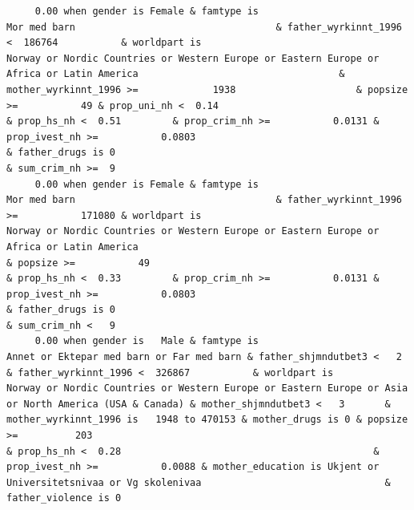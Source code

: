 \documentclass[
  letterpaper,
  DIV=11,
  numbers=noendperiod]{scrreprt}
\begin{document}
\begin{verbatim}
     0.00 when gender is Female & famtype is                                                     Mor med barn                                   & father_wyrkinnt_1996 <  186764           & worldpart is                                           Norway or Nordic Countries or Western Europe or Eastern Europe or Africa or Latin America                                   & mother_wyrkinnt_1996 >=             1938                     & popsize >=           49 & prop_uni_nh <  0.14                                              & prop_hs_nh <  0.51         & prop_crim_nh >=           0.0131 & prop_ivest_nh >=           0.0803                                                                                                                          & father_drugs is 0                                                                        & sum_crim_nh >=  9
     0.00 when gender is Female & famtype is                                                     Mor med barn                                   & father_wyrkinnt_1996 >=           171080 & worldpart is                                           Norway or Nordic Countries or Western Europe or Eastern Europe or Africa or Latin America                                                                                                  & popsize >=           49                                                                    & prop_hs_nh <  0.33         & prop_crim_nh >=           0.0131 & prop_ivest_nh >=           0.0803                                                                                                                          & father_drugs is 0                                                                        & sum_crim_nh <   9
     0.00 when gender is   Male & famtype is                        Annet or Ektepar med barn or Far med barn & father_shjmndutbet3 <   2       & father_wyrkinnt_1996 <  326867           & worldpart is                              Norway or Nordic Countries or Western Europe or Eastern Europe or Asia or North America (USA & Canada) & mother_shjmndutbet3 <   3       & mother_wyrkinnt_1996 is   1948 to 470153 & mother_drugs is 0 & popsize >=          203                                                                    & prop_hs_nh <  0.28                                            & prop_ivest_nh >=           0.0088 & mother_education is Ukjent or Universitetsnivaa or Vg skolenivaa                                & father_violence is 0                                                                                                               

\end{verbatim}
\end{document}
